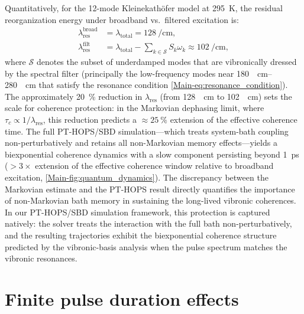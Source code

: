 \documentclass[11pt,a4paper]{article}
\begin{document}
Quantitatively, for the 12-mode Kleinekathöfer model at \SI{295}{\kelvin}, the residual reorganization energy under broadband vs.\ filtered excitation is:
\begin{align}
\lambda_{\mathrm{res}}^{\mathrm{broad}} &= \lambda_{\mathrm{total}} = \SI{128}{\per\centi\meter}, \label{eq:SI_lambda_broad} \\
\lambda_{\mathrm{res}}^{\mathrm{filt}} &= \lambda_{\mathrm{total}} - \sum_{k \in \mathcal{S}} S_k \omega_k \approx \SI{102}{\per\centi\meter}, \label{eq:SI_lambda_filt}
\end{align}
where $\mathcal{S}$ denotes the subset of underdamped modes that are vibronically dressed by the spectral filter (principally the low-frequency modes near \SIrange{180}{280}{\per\centi\meter} that satisfy the resonance condition \cref{Main-eq:resonance_condition}). The approximately \SI{20}{\percent} reduction in $\lambda_{\mathrm{res}}$ (from \SI{128}{\per\centi\meter} to \SI{102}{\per\centi\meter}) sets the scale for coherence protection: in the Markovian dephasing limit, where $\tau_c \propto 1/\lambda_{\mathrm{res}}$, this reduction predicts a $\approx\SI{25}{\percent}$ extension of the effective coherence time. The full PT-HOPS/SBD simulation---which treats system-bath coupling non-perturbatively and retains all non-Markovian memory effects---yields a biexponential coherence dynamics with a slow component persisting beyond \SI{1}{\pico\second} ($>3\times$ extension of the effective coherence window relative to broadband excitation, \cref{Main-fig:quantum_dynamics}). The discrepancy between the Markovian estimate and the PT-HOPS result directly quantifies the importance of non-Markovian bath memory in sustaining the long-lived vibronic coherences. In our PT-HOPS/SBD simulation framework, this protection is captured natively: the solver treats the interaction with the full bath non-perturbatively, and the resulting trajectories exhibit the biexponential coherence structure predicted by the vibronic-basis analysis when the pulse spectrum matches the vibronic resonances.



\section{Finite pulse duration effects}
\label{sec:S8}
\end{document}
